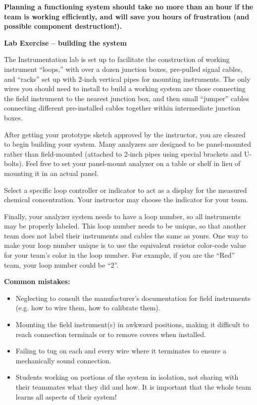 \documentclass[12pt,a4paper]{article}
\begin{document}
\vskip 10pt

{\bf Planning a functioning system should take no more than an hour if the team is working efficiently, and will save you hours of frustration (and possible component destruction!).}





\vfil \eject

\noindent
{\bf Lab Exercise -- building the system}

\vskip 5pt

The Instrumentation lab is set up to facilitate the construction of working instrument ``loops,'' with over a dozen junction boxes, pre-pulled signal cables, and ``racks'' set up with 2-inch vertical pipes for mounting instruments.  The only wires you should need to install to build a working system are those connecting the field instrument to the nearest junction box, and then small ``jumper'' cables connecting different pre-installed cables together within intermediate junction boxes.

After getting your prototype sketch approved by the instructor, you are cleared to begin building your system.  Many analyzers are designed to be panel-mounted rather than field-mounted (attached to 2-inch pipes using special brackets and U-bolts).  Feel free to set your panel-mount analyzer on a table or shelf in lieu of mounting it in an actual panel.  

Select a specific loop controller or indicator to act as a display for the measured chemical concentration.  Your instructor may choose the indicator for your team.  

Finally, your analyzer system needs to have a loop number, so all instruments may be properly labeled.  This loop number needs to be unique, so that another team does not label their instruments and cables the same as yours.  One way to make your loop number unique is to use the equivalent resistor color-code value for your team's color in the loop number.  For example, if you are the ``Red'' team, your loop number could be ``2''. 

\vskip 10pt

{\bf Common mistakes:}

\begin{itemize}
\item{} Neglecting to consult the manufacturer's documentation for field instruments (e.g. how to wire them, how to calibrate them).
\item{} Mounting the field instrument(s) in awkward positions, making it difficult to reach connection terminals or to remove covers when installed.
\item{} Failing to tug on each and every wire where it terminates to ensure a mechanically sound connection.
\item{} Students working on portions of the system in isolation, not sharing with their teammates what they did and how.  It is important that the whole team learns all aspects of their system!
\end{itemize}
\end{document}
